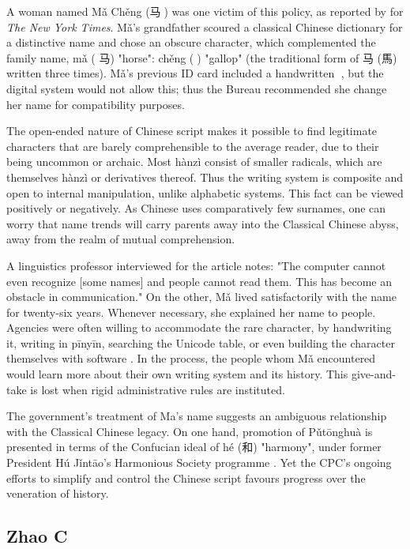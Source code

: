 A woman named Mǎ Chěng ({\zafont 马}{\zbfont 𩧢}) was one victim of this policy,
as reported by \textcite{lafraniere09} for \textit{The New York Times}. Mǎ's
grandfather scoured a classical Chinese dictionary for a distinctive name and
chose an obscure character, which complemented the family name, mǎ ({\zafont
马}) "horse": chěng ({\zbfont 𩧢}) "gallop" (the traditional form of {\zafont
马} ({\zafont 馬}) written three times). Mǎ's previous ID card included a
handwritten {\zbfont 𩧢}, but the digital system would not allow this; thus the
Bureau recommended she change her name for compatibility purposes.

The open-ended nature of Chinese script makes it possible to find legitimate
characters that are barely comprehensible to the average reader, due to their
being uncommon or archaic. Most hànzì consist of smaller radicals, which are
themselves hànzì or derivatives thereof. Thus the writing system is composite
and open to internal manipulation, unlike alphabetic systems. This fact can be
viewed positively or negatively. As Chinese uses comparatively few surnames, one
can worry that name trends will carry parents away into the Classical Chinese
abyss, away from the realm of mutual comprehension.

A linguistics professor interviewed for the \textcite{lafraniere09} article
notes: "The computer cannot even recognize [some names] and people cannot read
them. This has become an obstacle in communication." On the other, Mǎ lived
satisfactorily with the name for twenty-six years. Whenever necessary, she
explained her name to people. Agencies were often willing to accommodate the
rare character, by handwriting it, writing in pīnyīn, searching the Unicode
table, or even building the character themselves with software
\parencite{martinsen08}. In the process, the people whom Mǎ encountered would learn
more about their own writing system and its history. This give-and-take is lost
when rigid administrative rules are instituted.

The government's treatment of Ma's name suggests an ambiguous relationship with
the Classical Chinese legacy. On one hand, promotion of Pǔtōnghuà is presented
in terms of the Confucian ideal of hé ({\zafont 和}) "harmony", under former
President Hú Jǐntāo's Harmonious Society programme \parencite{wang16}. Yet the
CPC's ongoing efforts to simplify and control the Chinese script favours
progress over the veneration of history.

\subsection{Zhao C}

